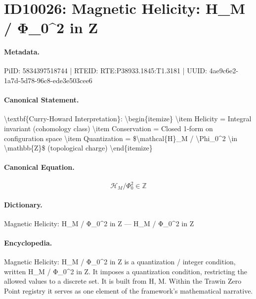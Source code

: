 \section*{ID10026: Magnetic Helicity: H\_M / Φ\_0\textasciicircum{}2 in Z}
\paragraph{Metadata.}
PiID: 5834397518744 | RTEID: RTE:P38933.1845:T1.3181 | UUID: 4ae9c6e2-1a7d-5d78-96c8-ede3e503cee6

\paragraph{Canonical Statement.}
\textbackslash{}textbf\{Curry-Howard Interpretation\}: \textbackslash{}begin\{itemize\} \textbackslash{}item Helicity = Integral invariant (cohomology class) \textbackslash{}item Conservation = Closed 1-form on configuration space \textbackslash{}item Quantization = \$\textbackslash{}mathcal\{H\}\_M / \textbackslash{}Phi\_0\textasciicircum{}2 \textbackslash{}in \textbackslash{}mathbb\{Z\}\$ (topological charge) \textbackslash{}end\{itemize\}

\paragraph{Canonical Equation.}
\[
\mathcal{H}_M / \Phi_0^2 \in \mathbb{Z}
\]

\paragraph{Dictionary.}
Magnetic Helicity: H\_M / Φ\_0\textasciicircum{}2 in Z — H\_M / Φ\_0\textasciicircum{}2 in Z

\paragraph{Encyclopedia.}
Magnetic Helicity: H\_M / Φ\_0\textasciicircum{}2 in Z is a quantization / integer condition, written H\_M / Φ\_0\textasciicircum{}2 in Z. It imposes a quantization condition, restricting the allowed values to a discrete set. It is built from H, M. Within the Trawin Zero Point registry it serves as one element of the framework's mathematical narrative.
